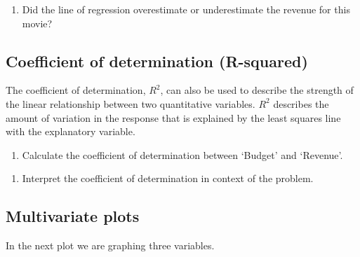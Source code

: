 \documentclass[
]{report}
\providecommand{\tightlist}{%
  \setlength{\itemsep}{0pt}\setlength{\parskip}{0pt}}
\begin{document}
\vspace{1in}

\begin{enumerate}
\def\labelenumi{\arabic{enumi}.}
\setcounter{enumi}{13}
\tightlist
\item
  Did the line of regression overestimate or underestimate the revenue for this movie?
\end{enumerate}

\vspace{1in}

\hypertarget{coefficient-of-determination-r-squared}{%
\subsection{Coefficient of determination (R-squared)}\label{coefficient-of-determination-r-squared}}

The coefficient of determination, \(R^2\), can also be used to describe the strength of the linear relationship between two quantitative variables. \(R^2\) describes the amount of variation in the response that is explained by the least squares line with the explanatory variable.

\begin{enumerate}
\def\labelenumi{\arabic{enumi}.}
\setcounter{enumi}{14}
\tightlist
\item
  Calculate the coefficient of determination between `Budget' and `Revenue'.
\end{enumerate}

\vspace{1in}

\begin{enumerate}
\def\labelenumi{\arabic{enumi}.}
\setcounter{enumi}{15}
\tightlist
\item
  Interpret the coefficient of determination in context of the problem.
\end{enumerate}

\vspace{1in}

\newpage

\hypertarget{multivariate-plots}{%
\subsection{Multivariate plots}\label{multivariate-plots}}

In the next plot we are graphing three variables.
\end{document}
